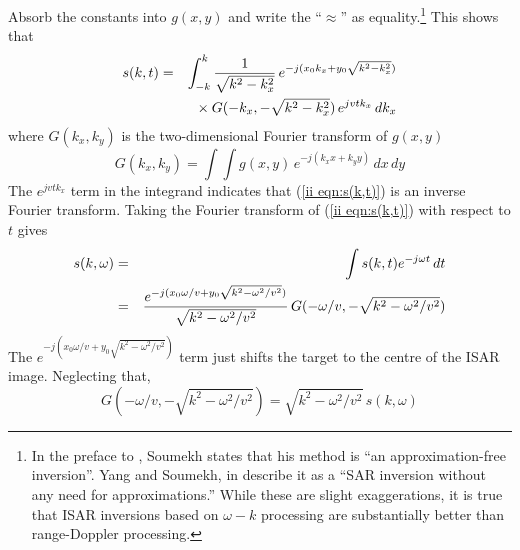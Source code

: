 Absorb the constants into $g(x,y)$ and write the ``$\approx$'' as 
equality.\footnote{In the preface to \protect\cite{Sou94}, Soumekh states
that his method is ``an approximation-free inversion''.  Yang and Soumekh,
in \protect\cite{Yan93} describe it as a ``SAR inversion without any need
for approximations.''  While these are slight exaggerations, it is true that
ISAR inversions based on $\omega-k$ processing are substantially better 
than range-Doppler processing.}  This shows that
\begin{eqnarray}
s(k,t)&=&\int_{-k}^k \frac{1}{\sqrt{k^2-k_x^2}}
\,e^{-j(x_0k_x+y_0\sqrt{k^2-k_x^2})}	{\nonumber}\\
&&{}\times G(-k_x,-\sqrt{k^2-k_x^2})\,e^{jvtk_x}\,dk_x
\label{ii eqn:s(k,t)}
\end{eqnarray}
where $G(k_x,k_y)$ is the two-dimensional Fourier transform of $g(x,y)$
\begin{equation}
G(k_x,k_y)=\int\!\!\int g(x,y) \,e^{-j(k_xx+k_yy)}\,dx\,dy
\end{equation}
The $e^{jvtk_x}$ term in the integrand indicates that (\ref{ii eqn:s(k,t)})
is an inverse Fourier transform.  Taking the Fourier transform of 
(\ref{ii eqn:s(k,t)}) with respect to $t$ gives
\begin{eqnarray}
s(k,\omega)
&=&\int s(k,t) e^{-j\omega t}\,dt		{\nonumber}\\
&=&
\frac{e^{-j(x_0\omega/v+y_0\sqrt{k^2-\omega^2/v^2})}}
{\sqrt{k^2-\omega^2/v^2}} 
\,G(-\omega/v,-\sqrt{k^2-\omega^2/v^2})
\end{eqnarray}
The $e^{-j(x_0\omega/v+y_0\sqrt{k^2-\omega^2/v^2})}$ term just shifts the
target to the centre of the ISAR image.  Neglecting that,
\begin{equation}\label{ii eqn:Soumekh inversion}
G(-\omega/v,-\sqrt{k^2-\omega^2/v^2})=\sqrt{k^2-\omega^2/v^2}\,s(k,\omega)
\end{equation}

